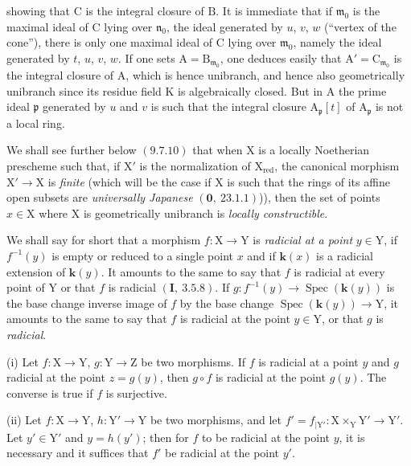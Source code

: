 showing that $\mathrm{C}$ is the integral closure of $\mathrm{B}$. It is immediate that if $\mathfrak{m}_0$ is the maximal ideal
of $\mathrm{C}$ lying over $\mathfrak{n}_0$, the ideal generated by $u$, $v$, $w$ (``vertex of the cone''), there is only one maximal
ideal of $\mathrm{C}$ lying over $\mathfrak{m}_0$, namely the ideal generated by $t$, $u$, $v$, $w$. If one sets $\mathrm{A}=\mathrm{B}_{\mathfrak{m}_0}$, one deduces
easily that $\mathrm{A}'=\mathrm{C}_{\mathfrak{m}_0}$ is the integral closure of $\mathrm{A}$, which is hence unibranch, and hence
also geometrically unibranch since its residue field $\mathrm{K}$ is algebraically closed.
But in $\mathrm{A}$ the prime ideal $\mathfrak{p}$ generated by $u$ and $v$ is such that the integral
closure $\mathrm{A}_\mathfrak{p}[t]$ of $\mathrm{A}_\mathfrak{p}$ is not a local ring.

We shall see further below $(9.7.10)$ that when $\mathrm{X}$ is a locally Noetherian prescheme
such that, if $\mathrm{X}'$ is the normalization of $\mathrm{X}_{\mathrm{red}}$, the canonical morphism $\mathrm{X}'\to\mathrm{X}$
is \emph{finite} (which will be the case if $\mathrm{X}$ is such that the rings of its affine open subsets are
\emph{universally Japanese} $(\mathbf{0},~23.1.1)$)), then the set of points $x\in\mathrm{X}$ where $\mathrm{X}$ is geometrically
unibranch is \emph{locally constructible}.

\begin{env}[6.15.3]
\label{IV.6.15.3}
We shall say for short that a morphism $f:\mathrm{X}\to\mathrm{Y}$ is \emph{radicial at a
point} $y\in\mathrm{Y}$, if $f^{-1}(y)$ is empty or reduced to a single point $x$ and if $\boldsymbol{k}(x)$ is a radicial extension
of $\boldsymbol{k}(y)$. It amounts to the same to say that $f$ is radicial at every point of $\mathrm{Y}$
or that $f$ is radicial $(\mathbf{I},~3.5.8)$. If $g:f^{-1}(y)\to\operatorname{Spec}(\boldsymbol{k}(y))$ is the base change inverse
image of $f$ by the base change $\operatorname{Spec}(\boldsymbol{k}(y))\to\mathrm{Y}$, it amounts to the same to say that $f$
is radicial at the point $y\in\mathrm{Y}$, or that $g$ is \emph{radicial}.
\end{env}

\begin{lemma}[6.15.3.1]
\label{IV.6.15.3.1}
(i) Let $f:\mathrm{X}\to\mathrm{Y}$, $g:\mathrm{Y}\to\mathrm{Z}$ be two morphisms. If $f$ is radicial
at a point $y$ and $g$ radicial at the point $z=g(y)$, then $g\circ f$ is radicial at the point $g(y)$. The converse
is true if $f$ is surjective.

(ii) Let $f:\mathrm{X}\to\mathrm{Y}$, $h:\mathrm{Y}'\to\mathrm{Y}$ be two morphisms, and let $f'=f_{|\mathrm{Y}'}:\mathrm{X}\times_\mathrm{Y}\mathrm{Y}'\to\mathrm{Y}'$.
Let $y'\in\mathrm{Y}'$ and $y=h(y')$; then for $f$ to be radicial at the point $y$, it is necessary and it suffices that $f'$ be
radicial at the point $y'$.
\end{lemma}

